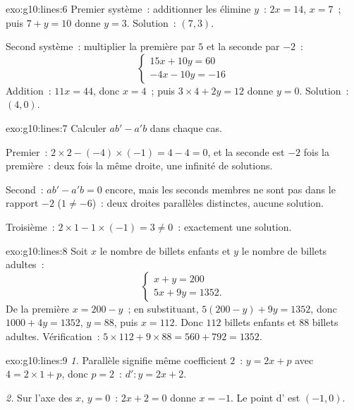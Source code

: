 \begin{solution}{exo:g10:lines:6}
Premier système~: additionner les  élimine $y$~: $2x = 14$,
$x = 7$~; puis $7 + y = 10$ donne $y = 3$. Solution~: $(7, 3)$.

Second système~: multiplier la première  par $5$ et la seconde
par $-2$~:
\[
\begin{cases}
15x + 10y = 60 \\
-4x - 10y = -16
\end{cases}
\]
Addition~: $11x = 44$, donc $x = 4$~; puis $3 \times 4 + 2y = 12$
donne $y = 0$. Solution~: $(4, 0)$.
\end{solution}

\begin{solution}{exo:g10:lines:7}
Calculer $ab' - a'b$ dans chaque cas.

Premier~: $2 \times 2 - (-4) \times (-1) = 4 - 4 = 0$, et la seconde
 est $-2$ fois la première~: deux fois la même droite, une
infinité de solutions.

Second~: $ab' - a'b = 0$ encore, mais les seconds membres ne sont pas
dans le rapport $-2$ ($1 \neq -6$)~: deux droites parallèles distinctes,
aucune solution.

Troisième~: $2 \times 1 - 1 \times (-1) = 3 \neq 0$~: exactement une
solution.
\end{solution}

\begin{solution}{exo:g10:lines:8}
Soit $x$ le nombre de billets enfants et $y$ le nombre de billets
adultes~:
\[
\begin{cases}
x + y = 200 \\
5x + 9y = 1352 .
\end{cases}
\]
De la première  $x = 200 - y$~; en substituant,
$5(200 - y) + 9y = 1352$, donc $1000 + 4y = 1352$, $y = 88$, puis
$x = 112$. Donc $112$ billets enfants et $88$ billets adultes.
Vérification~: $5 \times 112 + 9 \times 88 = 560 + 792 = 1352$.
\end{solution}

\begin{solution}{exo:g10:lines:9}
\emph{1.} Parallèle signifie même coefficient $2$~: $y = 2x + p$ avec
$4 = 2 \times 1 + p$, donc $p = 2$~: $d'\colon y = 2x + 2$.

\emph{2.} Sur l'axe des $x$, $y = 0$~: $2x + 2 = 0$ donne $x = -1$. Le
point d' est $(-1, 0)$.
\end{solution}

